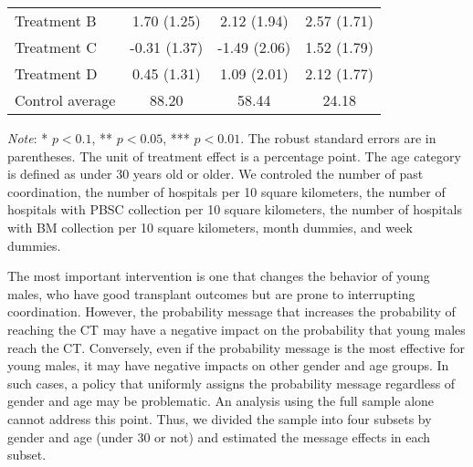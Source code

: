\documentclass[12pt, a4paper]{article}
\begin{document}
\begin{table}
\begin{threeparttable}
\begin{tabular}[t]{lccc}
\hspace{1em}Treatment B & 1.70 (1.25) & 2.12 (1.94) & 2.57 (1.71)\\
\hspace{1em}Treatment C & -0.31 (1.37) & -1.49 (2.06) & 1.52 (1.79)\\
\hspace{1em}Treatment D & 0.45 (1.31) & 1.09 (2.01) & 2.12 (1.77)\\
\hspace{1em}Control average & 88.20 & 58.44 & 24.18\\
\bottomrule
\end{tabular}
\begin{tablenotes}
\item \emph{Note}: * $p < 0.1$, ** $p < 0.05$, *** $p < 0.01$. The robust standard errors are in parentheses. The unit of treatment effect is a percentage point. The age category is defined as under 30 years old or older. We controled the number of past coordination, the number of hospitals per 10 square kilometers, the number of hospitals with PBSC collection per 10 square kilometers, the number of hospitals with BM collection per 10 square kilometers, month dummies, and week dummies.
\end{tablenotes}
\end{threeparttable}
\end{table}

The most important intervention is one that changes the behavior of young males, who have good transplant outcomes but are prone to interrupting coordination. However, the probability message that increases the probability of reaching the CT may have a negative impact on the probability that young males reach the CT. Conversely, even if the probability message is the most effective for young males, it may have negative impacts on other gender and age groups. In such cases, a policy that uniformly assigns the probability message regardless of gender and age may be problematic. An analysis using the full sample alone cannot address this point. Thus, we divided the sample into four subsets by gender and age (under 30 or not) and estimated the message effects in each subset.
\end{document}
